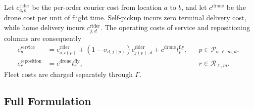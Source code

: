 \documentclass[final,3p,authoryear]{elsarticle}
\begin{document}
Let $c_{a,b}^{\mathrm{rider}}$ be the per-order courier cost from location $a$ to $b$, and let $c^{\mathrm{drone}}$ be the drone cost per unit of flight time.
Self-pickup incurs zero terminal delivery cost, while home delivery incurs $c_{j,d}^{\mathrm{rider}}$.
The operating costs of service and repositioning columns are consequently
\begin{align}
 c_p^{\mathrm{service}}
 &=c_{o,i(p)}^{\mathrm{rider}}
 +(1-\sigma_{d,j(p)})c_{j(p),d}^{\mathrm{rider}}
 +c^{\mathrm{drone}}t_p^{\mathrm{fly}},
 &&p\in\mathcal P_{o,\ell,m,d},\label{eq:path_service_cost}\\
 c_r^{\mathrm{reposition}}
 &=c^{\mathrm{drone}}t_r^{\mathrm{fly}},
 &&r\in\mathcal R_{\ell,m}.\label{eq:path_empty_cost}
\end{align}
Fleet costs are charged separately through $\Gamma$.

\subsection{Full Formulation}
\label{subsec:path_full}
\end{document}
